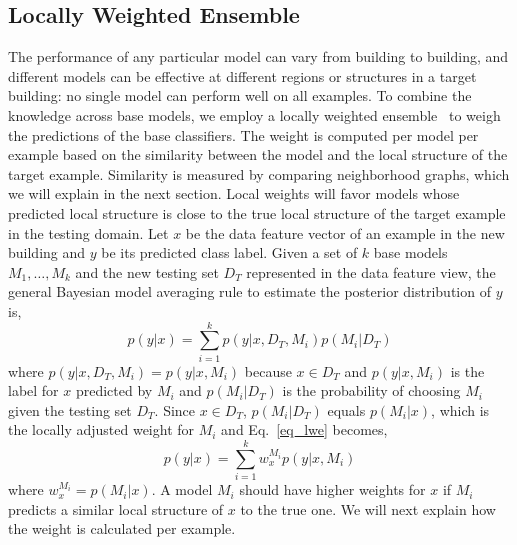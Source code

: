 \subsection{Locally Weighted Ensemble}
The performance of any particular model can vary from building to building, and different models can be effective at different regions or structures in a target building: no single model can perform well on all examples. 
To combine the knowledge across base models,  
we employ a locally weighted ensemble~\cite{lwe} to weigh the predictions of the base classifiers. 
The weight is computed per model per example based on the similarity between the model and the local structure of the target example. 
Similarity is measured by comparing neighborhood graphs, which we will explain in the next section. 
Local weights will favor models whose predicted local structure is close to the true local structure of the target example in the testing domain. 
Let $x$ be the data feature vector of an example in the new building and $y$ be its predicted class label. Given a set of $k$ base models $M_1, \dots, M_k$ and the new testing set $D_T$ represented in the data feature view, the general Bayesian model averaging rule to estimate the posterior distribution of $y$ is,
\begin{equation}\label{eq_lwe}
p(y|x)=\sum_{i=1}^k p(y|x,D_T,M_i) p(M_i|D_T)
\end{equation}
where $p(y|x,D_T,M_i) = p(y|x,M_i)$ because $x \in D_T$ and $p(y|x,M_i)$ is the label for $x$ predicted by $M_i$ and $p(M_i|D_T)$ is the probability of choosing $M_i$ given the testing set $D_T$. 
Since $x \in D_T$, $p(M_i|D_T)$ equals $p(M_i|x)$, which is the locally adjusted weight for $M_i$ and Eq.~\ref{eq_lwe} becomes,
\begin{equation}\label{eq_sum}
p(y|x)=\sum_{i=1}^k w_{x}^{M_i} p(y|x, M_i)
\end{equation}
where $w_{x}^{M_i} = p(M_i|x)$.  A model $M_i$ should have higher weights for $x$ if $M_i$ predicts a similar local structure of $x$ to the true one.
We will next explain how the weight is calculated per example.

